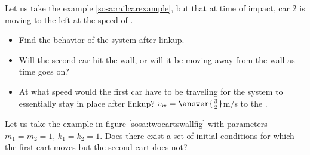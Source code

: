 \documentclass{ximera}
\begin{document}
\begin{exercise}
    Let us take the example \ref{sosa:railcarexample}, but that at time of impact, car 2 is moving to the left at the speed of .
    \begin{itemize}
        \item Find the behavior of the system after linkup.
        \item Will the second car hit the wall, or will it be moving away from the wall as time goes on? 
        \item At what speed would the first car have to be traveling for the system to essentially stay in place after linkup? $v_w = \answer{\frac{3}{2}}$m/s to the .
    \end{itemize}
\end{exercise}

\begin{exercise}
    Let us take the example in figure \ref{sosa:twocartswallfig} with parameters $m_1 = m_2 = 1$, $k_1 = k_2 = 1$.  Does there exist a set of initial conditions for which the first cart moves but the second cart does not? %
\end{exercise}
\end{document}
